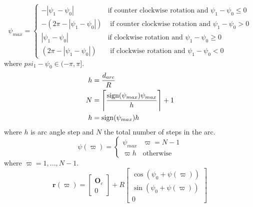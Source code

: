 \begin{equation}
\psi_{max} = \begin{cases}
-|\psi_1 - \psi_0| & \text{if counter clockwise rotation and } \psi_1 - \psi_0 \leq 0 \\
-(2\pi - |\psi_1-\psi_0|) & \text{ if counter clockwise rotation and } \psi_1 - \psi_0 > 0 \\
|\psi_1 - \psi_0| & \text{if clockwise rotation and } \psi_1 - \psi_0 \geq 0 \\
(2\pi - |\psi_1-\psi_0|) & \text{ if clockwise rotation and } \psi_1 - \psi_0 < 0
\end{cases}
\end{equation}
where $psi_1-\psi_0 \in(-\pi,\pi]$.
\begin{subequations}
\begin{align}
h &= \frac{d_{arc}}{R} \\
N &= \ceil[\Bigg]{\frac{\text{sign}(\psi_{max})\psi_{max}}{h}} + 1 \\
h &= \text{sign}(\psi_{max})h
\end{align}
\end{subequations}
where $h$ is arc angle step and $N$ the total number of steps in the arc.
\begin{equation}
\psi(\varpi) = \begin{cases}
\psi_{max} & \varpi = N-1 \\
\varpi h & \text{otherwise}
\end{cases}
\end{equation}
where $\varpi = 1,...,N-1$.
\begin{equation}
\mathbf{r}(\varpi) = \begin{bmatrix}
\mathbf{O}_c \\
0
\end{bmatrix} + R\begin{bmatrix}
\cos(\psi_0 + \psi(\varpi)) \\
\sin(\psi_0 + \psi(\varpi)) \\
0
\end{bmatrix}
\end{equation}

